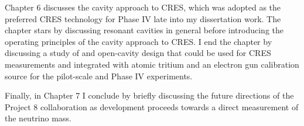 Chapter 6 discusses the cavity approach to CRES, which was adopted as the preferred CRES technology for Phase IV late into my dissertation work. The chapter stars by discussing resonant cavities in general before introducing the operating principles of the cavity approach to CRES. I end the chapter by discussing a study of and open-cavity design that could be used for CRES measurements and integrated with atomic tritium and an electron gun calibration source for the pilot-scale and Phase IV experiments.

Finally, in Chapter 7 I conclude by briefly discussing the future directions of the Project 8 collaboration as development proceeds towards a direct measurement of the neutrino mass. 




